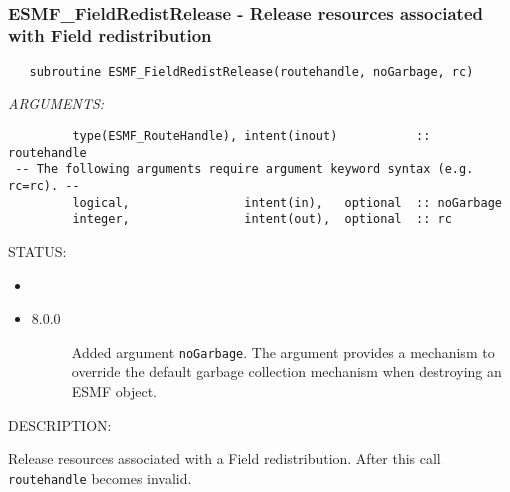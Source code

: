  
\mbox{}\hrulefill\ 
 
\subsubsection [ESMF\_FieldRedistRelease] {ESMF\_FieldRedistRelease - Release resources associated with Field redistribution}


  
\begin{verbatim}   subroutine ESMF_FieldRedistRelease(routehandle, noGarbage, rc)\end{verbatim}{\em ARGUMENTS:}
\begin{verbatim}         type(ESMF_RouteHandle), intent(inout)           :: routehandle
 -- The following arguments require argument keyword syntax (e.g. rc=rc). --
         logical,                intent(in),   optional  :: noGarbage
         integer,                intent(out),  optional  :: rc\end{verbatim}
{\sf STATUS:}
   \begin{itemize}
   \item{}
   \item{}
   \begin{description}
   \item[8.0.0] Added argument {\tt noGarbage}.
     The argument provides a mechanism to override the default garbage collection
     mechanism when destroying an ESMF object.
   \end{description}
   \end{itemize}
  
{\sf DESCRIPTION:\\ }


     Release resources associated with a Field redistribution. After this call
     {\tt routehandle} becomes invalid.
  

